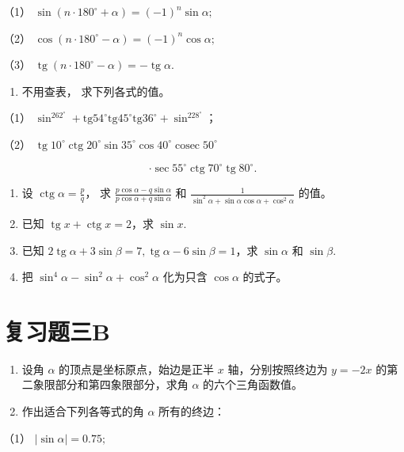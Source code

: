 （1） \(\sin (n\cdot 180^{\circ} + \alpha) = (-1)^{n}\sin \alpha ;\)

（2） \(\cos (n\cdot 180^{\circ} - \alpha) = (-1)^{n}\cos \alpha ;\)

（3）
\(\operatorname{tg}(n \cdot 180^{\circ} - \alpha) = -\operatorname{tg} \alpha.\)

\begin{enumerate}[start=7]
\item
  不用查表， 求下列各式的值。
\end{enumerate}

（1）
\(\sin^262^\circ + \mathrm{tg} 54^\circ \mathrm{tg} 45^\circ \mathrm{tg} 36^\circ + \sin^228^\circ\)；

（2）
\(\operatorname{tg} 10^{\circ} \operatorname{ctg} 20^{\circ} \sin 35^{\circ} \cos 40^{\circ} \operatorname{cosec} 50^{\circ}\)

\[
\cdot \sec 55 ^{\circ} \operatorname{ctg} 70 ^{\circ} \operatorname{tg} 80 ^{\circ}.
\]

\begin{enumerate}[start=8]
\item
  设 \(\operatorname{ctg} \alpha = \frac{p}{q}\)， 求
  \(\frac{p \cos \alpha - q \sin \alpha}{p \cos \alpha + q \sin \alpha}\)
  和
  \(\frac{1}{\sin^2 \alpha + \sin \alpha \cos \alpha + \cos^2 \alpha}\)
  的值。
\item
  已知 \(\operatorname{tg} x + \operatorname{ctg} x = 2\)，求
  \(\sin x\).
\item
  已知
  \(2 \operatorname{tg} \alpha + 3 \sin \beta = 7, \operatorname{tg} \alpha - 6 \sin \beta = 1\)，求
  \(\sin \alpha\) 和 \(\sin \beta\).
\item
  把 \(\sin^4\alpha -\sin^2\alpha +\cos^2\alpha\) 化为只含
  \(\cos \alpha\) 的式子。
\end{enumerate}

\section{复习题三B}

\begin{enumerate}
\item
  设角 \(\alpha\) 的顶点是坐标原点，始边是正半 \(x\) 轴，分别按照终边为
  \(y = -2x\) 的第二象限部分和第四象限部分，求角 \(\alpha\)
  的六个三角函数值。
\item
  作出适合下列各等式的角 \(\alpha\) 所有的终边：
\end{enumerate}

（1） \(|\sin \alpha| = 0.75;\)

